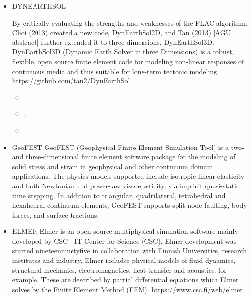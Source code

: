 \begin{itemize}
\item {\codefont DYNEARTHSOL} 

By critically evaluating the strengths and weaknesses of the
FLAC algorithm, Choi \etal (2013) created a new code, DynEarthSol2D, 
and Tan \etal (2013) [AGU abstract] further extended it to three
dimensions, DynEarthSol3D. DynEarthSol3D (Dynamic Earth Solver
in three Dimensions) is a robust, flexible, open source finite
element code for modeling non-linear responses of continuous
media and thus suitable for long-term tectonic modeling.
\url{https://github.com/tan2/DynEarthSol}

\begin{scriptsize} 
\begin{itemize}
\item[\twothousandthirteen]  \textcite{chtl13}
\item[\twothousandfifteen]   \textcite{jalr15},  \textcite{tact15}
\item[\twothousandseventeen] \textcite{lolc17}
\end{itemize}
\end{scriptsize} 

\item {\codefont GeoFEST} 
GeoFEST (Geophysical Finite Element Simulation Tool) is a two- and three-dimensional finite
element software package for the modeling of solid stress and strain in geophysical and 
other continuum domain applications.
The physics models supported include isotropic linear elasticity and both Newtonian and power-law
viscoelasticity, via implicit quasi-static time stepping. In addition to triangular, 
quadrilateral, tetrahedral and hexahedral continuum elements, GeoFEST supports split-node 
faulting, body forces, and surface tractions.


{\small
\noindent
\cite{paln08}
}

\item {\codefont ELMER} 
Elmer is an open source multiphysical simulation software mainly developed by 
CSC - IT Center for Science (CSC). Elmer development was started nineteenninetyfive in collaboration with 
Finnish Universities, research institutes and industry. Elmer includes physical models of 
fluid dynamics, structural mechanics, electromagnetics, heat transfer and acoustics, 
for example. These are described by partial differential equations which Elmer solves 
by the Finite Element Method (FEM). \url{https://www.csc.fi/web/elmer}


\end{itemize}
